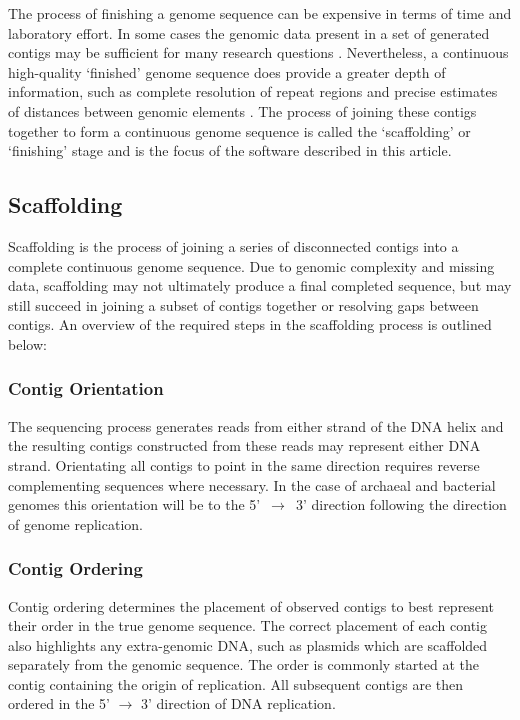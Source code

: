 \documentclass[10pt]{bmc_article}
\newenvironment{bmcformat}{\begin{raggedright}\baselineskip20pt\sloppy\setboolean{publ}{false}}{\end{raggedright}\baselineskip20pt\sloppy}
\begin{document}
\begin{bmcformat}
The process of finishing a genome sequence can be expensive in terms of time
and laboratory effort. In some cases the genomic data present in a set of
generated contigs may be sufficient for many research questions
\cite{branscomb2002}. Nevertheless, a continuous high-quality `finished'
genome sequence does provide a greater depth of information, such as complete
resolution of repeat regions and precise estimates of distances between
genomic elements \cite{parkhill2002,fraser2002}. The process of joining these
contigs together to form a continuous genome sequence is called the
`scaffolding' or `finishing' stage and is the focus of the software described
in this article. \pb

\subsection*{Scaffolding} %

Scaffolding is the process of joining a series of disconnected contigs into a
complete continuous genome sequence. Due to genomic complexity and missing
data, scaffolding may not ultimately produce a final completed sequence, but
may still succeed in joining a subset of contigs together or resolving gaps
between contigs. An overview of the required steps in the scaffolding process
is outlined below:

\subsubsection*{Contig Orientation} %

The sequencing process generates reads from either strand of the DNA helix and
the resulting contigs constructed from these reads may represent either DNA
strand. Orientating all contigs to point in the same direction requires reverse
complementing sequences where necessary. In the case of archaeal and bacterial
genomes this orientation will be to the 5'~$\rightarrow$~3' direction following
the direction of genome replication.

\subsubsection*{Contig Ordering} %

Contig ordering determines the placement of observed contigs to best represent
their order in the true genome sequence. The correct placement of each contig
also highlights any extra-genomic DNA, such as plasmids which are scaffolded
separately from the genomic sequence. The order is commonly started at the
contig containing the origin of replication. All subsequent contigs are then
ordered in the 5' $\rightarrow$ 3' direction of DNA replication.


\end{bmcformat}
\end{document}
